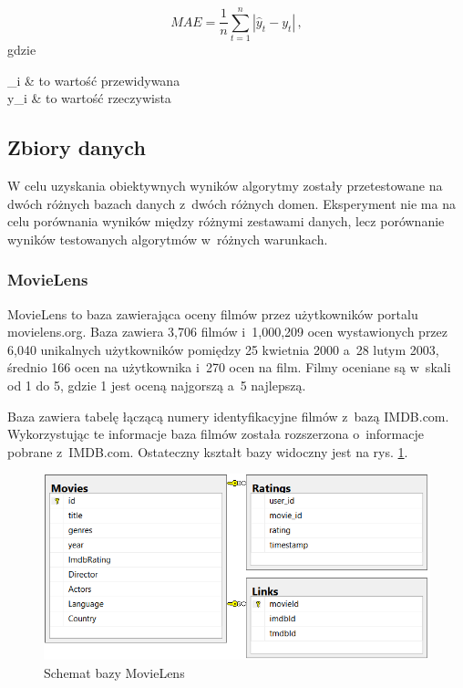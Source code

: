 \documentclass[twoside]{iisthesis}
\begin{document}
		\begin{equation}
		\label{eq:mae}
		MAE = \frac{1}{n} \sum_{t=1}^{n} |\hat{y}_t - y_t|
		\,,
		\end{equation}		
		gdzie
		
		\begin{conditions*}
			_i & to wartość przewidywana \\
			y_i  &  to wartość rzeczywista
		\end{conditions*} 
	
	
		\subsection{Zbiory danych}
		
		W celu uzyskania obiektywnych wyników algorytmy zostały przetestowane na dwóch różnych bazach danych z~dwóch różnych domen. Eksperyment nie ma na celu porównania wyników między różnymi zestawami danych, lecz porównanie wyników testowanych algorytmów w~różnych warunkach. 
		
		\subsubsection{MovieLens}
		MovieLens \cite{harper2016movielens} to baza zawierająca oceny filmów przez użytkowników portalu movielens.org. Baza zawiera 3,706 filmów i~1,000,209 ocen wystawionych przez 6,040 unikalnych użytkowników pomiędzy 25 kwietnia 2000 a~28 lutym 2003, średnio 166 ocen na użytkownika i~270 ocen na film. Filmy oceniane są w~skali od 1 do 5, gdzie 1 jest oceną najgorszą a~5 najlepszą. 
		
		Baza zawiera tabelę łączącą numery identyfikacyjne filmów z~bazą IMDB.com. Wykorzystując te informacje baza filmów została rozszerzona o~informacje pobrane z~IMDB.com. Ostateczny kształt bazy widoczny jest na rys. \ref{fig:movielens_schema}.
		
			\begin{figure}[!ht] 
				\centering
				\includegraphics[width=1\textwidth]{movielens}
				\caption{Schemat bazy MovieLens}
				\label{fig:movielens_schema}
			\end{figure}
		
\end{document}
